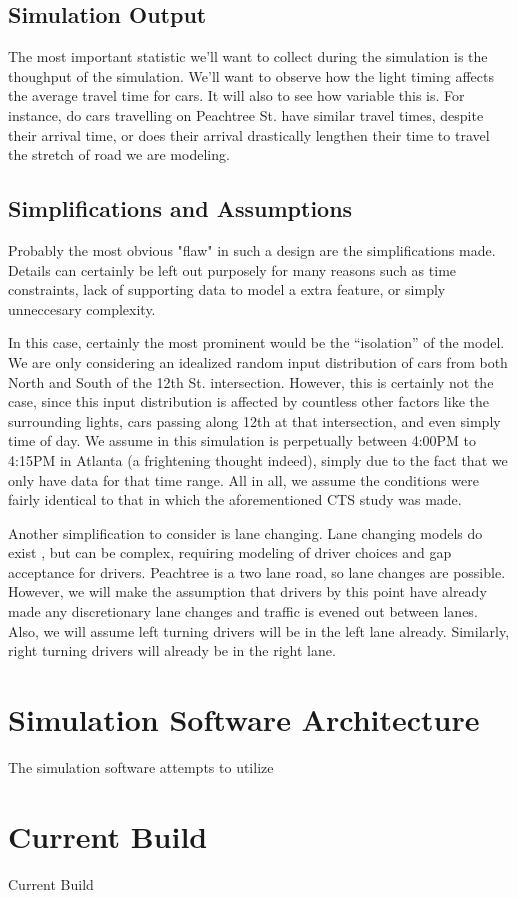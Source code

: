 \documentclass[a4paper,12pt]{article}
\begin{document}
\subsection{Simulation Output}
The most important statistic we'll want to collect during the simulation is the thoughput of the simulation. We'll
want to observe how the light timing affects the average travel time for cars. It will also to see how variable this
is. For instance, do cars travelling on Peachtree St. have similar travel times, despite their arrival time, or does
their arrival drastically lengthen their time to travel the stretch of road we are modeling. 

\subsection{Simplifications and Assumptions}
Probably the most obvious "flaw" in such a design are the simplifications made. Details can certainly be left out
purposely for many reasons such as time constraints, lack of supporting data to model a extra feature, or simply
unneccesary complexity.

In this case, certainly the most prominent would be the ``isolation'' of the model. We are only considering an
idealized random input distribution of cars from both North and South of the 12th St. intersection. However, this is
certainly not the case, since this input distribution is affected by countless other factors like the surrounding
lights, cars passing along 12th at that intersection, and even simply time of day. We assume in this simulation is
perpetually between 4:00PM to 4:15PM in Atlanta (a frightening thought indeed), simply due to the fact that we only
have data for that time range. All in all, we assume the conditions were fairly identical to that in which the 
aforementioned CTS study was made.

Another simplification to consider is lane changing. Lane changing models do exist \cite{lanechanging} \cite{lanechanging2},
but can be complex, requiring modeling of driver choices and gap acceptance for drivers. Peachtree is a two lane road,
so lane changes are possible. However, we will make the assumption that drivers by this point have already made any
discretionary lane changes and traffic is evened out between lanes. Also, we will assume left turning drivers will be
in the left lane already. Similarly, right turning drivers will already be in the right lane.

\section{Simulation Software Architecture}
The simulation software attempts to utilize 

\section{Current Build}
Current Build

\cite{cts12}


\end{document}
